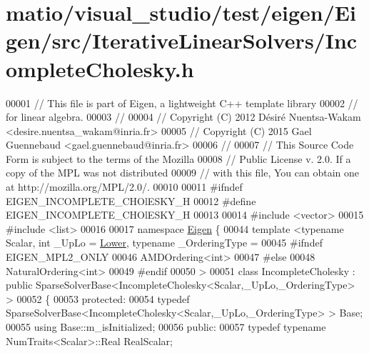 \hypertarget{matio_2visual__studio_2test_2eigen_2_eigen_2src_2_iterative_linear_solvers_2_incomplete_cholesky_8h_source}{}\section{matio/visual\+\_\+studio/test/eigen/\+Eigen/src/\+Iterative\+Linear\+Solvers/\+Incomplete\+Cholesky.h}
\label{matio_2visual__studio_2test_2eigen_2_eigen_2src_2_iterative_linear_solvers_2_incomplete_cholesky_8h_source}

\begin{DoxyCode}
00001 \textcolor{comment}{// This file is part of Eigen, a lightweight C++ template library}
00002 \textcolor{comment}{// for linear algebra.}
00003 \textcolor{comment}{//}
00004 \textcolor{comment}{// Copyright (C) 2012 Désiré Nuentsa-Wakam <desire.nuentsa\_wakam@inria.fr>}
00005 \textcolor{comment}{// Copyright (C) 2015 Gael Guennebaud <gael.guennebaud@inria.fr>}
00006 \textcolor{comment}{//}
00007 \textcolor{comment}{// This Source Code Form is subject to the terms of the Mozilla}
00008 \textcolor{comment}{// Public License v. 2.0. If a copy of the MPL was not distributed}
00009 \textcolor{comment}{// with this file, You can obtain one at http://mozilla.org/MPL/2.0/.}
00010 
00011 \textcolor{preprocessor}{#ifndef EIGEN\_INCOMPLETE\_CHOlESKY\_H}
00012 \textcolor{preprocessor}{#define EIGEN\_INCOMPLETE\_CHOlESKY\_H}
00013 
00014 \textcolor{preprocessor}{#include <vector>}
00015 \textcolor{preprocessor}{#include <list>}
00016 
00017 \textcolor{keyword}{namespace }\hyperlink{namespace_eigen}{Eigen} \{  
00044 \textcolor{keyword}{template} <\textcolor{keyword}{typename} Scalar, \textcolor{keywordtype}{int} \_UpLo = \hyperlink{group__enums_gga39e3366ff5554d731e7dc8bb642f83cda891792b8ed394f7607ab16dd716f60e6}{Lower}, \textcolor{keyword}{typename} \_OrderingType =
00045 \textcolor{preprocessor}{#ifndef EIGEN\_MPL2\_ONLY}
00046 AMDOrdering<int>
00047 \textcolor{preprocessor}{#else}
00048 NaturalOrdering<int>
00049 \textcolor{preprocessor}{#endif}
00050 >
00051 \textcolor{keyword}{class }IncompleteCholesky : \textcolor{keyword}{public} SparseSolverBase<IncompleteCholesky<Scalar,\_UpLo,\_OrderingType> >
00052 \{
00053   \textcolor{keyword}{protected}:
00054     \textcolor{keyword}{typedef} SparseSolverBase<IncompleteCholesky<Scalar,\_UpLo,\_OrderingType> > Base;
00055     \textcolor{keyword}{using} Base::m\_isInitialized;
00056   \textcolor{keyword}{public}:
00057     \textcolor{keyword}{typedef} \textcolor{keyword}{typename} NumTraits<Scalar>::Real RealScalar; 

\end{DoxyCode}
